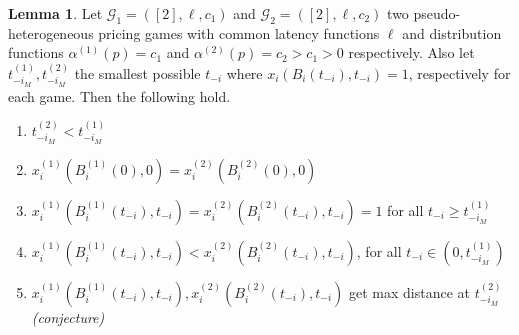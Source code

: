 \documentclass[10pt,a4paper]{book}
\newcommand{\Gm}{\mathcal{G}}
\theoremstyle{definition}
\newtheorem{lemma}[definition]{Lemma}
\theoremstyle{comment}
\begin{document}
\begin{lemma}
	\label{lemma:a_fixed_t_iM}
	Let $\Gm_1 = ([2], \ell, c_1)$ and $\Gm_2 = ([2], \ell, c_2)$ two pseudo-heterogeneous pricing games with common latency functions $\ell$ and distribution functions $\alpha^{(1)}(p) = c_1$ and $\alpha^{(2)}(p) = c_2 > c_1 > 0$ respectively.
	Also let $t_{-i_M}^{(1)}, t_{-i_M}^{(2)}$ the smallest possible $t_{-i}$ where $x_i(B_i(t_{-i}), t_{-i}) = 1$, respectively for each game.
	Then the following hold.
	\begin{enumerate}[$(i)$]
		\item $t_{-i_M}^{(2)} < t_{-i_M}^{(1)}$
		\item $x_i^{(1)}(B_i^{(1)}(0), 0) = x_i^{(2)}(B_i^{(2)}(0), 0)$
		\item $x_i^{(1)}(B_i^{(1)}(t_{-i}), t_{-i}) = x_i^{(2)}(B_i^{(2)}(t_{-i}), t_{-i}) = 1$ for all $t_{-i} \ge t_{-i_M}^{(1)}$
		\item $x_i^{(1)}(B_i^{(1)}(t_{-i}), t_{-i}) < x_i^{(2)}(B_i^{(2)}(t_{-i}), t_{-i})$, for all $t_{-i} \in (0, t_{-i_M}^{(1)})$
		\item $x_i^{(1)}(B_i^{(1)}(t_{-i}), t_{-i}), x_i^{(2)}(B_i^{(2)}(t_{-i}), t_{-i})$ get max distance at $t_{-i_M}^{(2)}$ \\
		\textit{(conjecture)}
	\end{enumerate}
\end{lemma}
\end{document}
